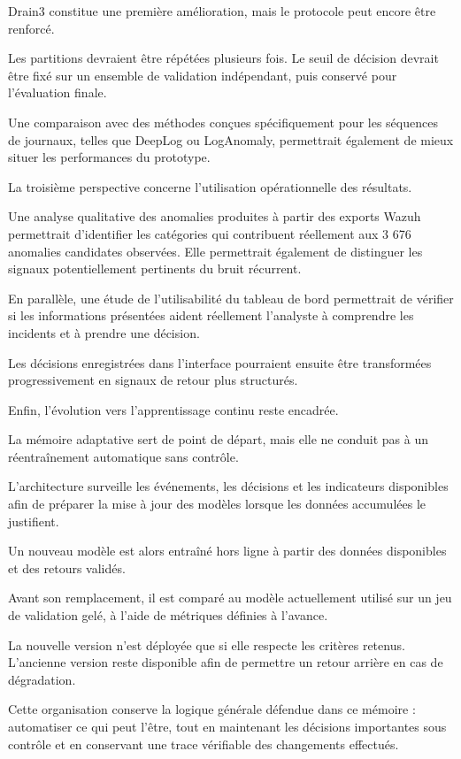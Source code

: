 Drain3 constitue une première amélioration, mais le protocole peut encore être renforcé.

Les partitions devraient être répétées plusieurs fois. Le seuil de décision devrait être fixé sur un ensemble de validation indépendant, puis conservé pour l'évaluation finale.

Une comparaison avec des méthodes conçues spécifiquement pour les séquences de journaux, telles que DeepLog ou LogAnomaly, permettrait également de mieux situer les performances du prototype.

La troisième perspective concerne l'utilisation opérationnelle des résultats.

Une analyse qualitative des anomalies produites à partir des exports Wazuh permettrait d'identifier les catégories qui contribuent réellement aux 3 676 anomalies candidates observées. Elle permettrait également de distinguer les signaux potentiellement pertinents du bruit récurrent.

En parallèle, une étude de l'utilisabilité du tableau de bord permettrait de vérifier si les informations présentées aident réellement l'analyste à comprendre les incidents et à prendre une décision.

Les décisions enregistrées dans l'interface pourraient ensuite être transformées progressivement en signaux de retour plus structurés.

Enfin, l'évolution vers l'apprentissage continu reste encadrée.

La mémoire adaptative sert de point de départ, mais elle ne conduit pas à un réentraînement automatique sans contrôle.

L'architecture surveille les événements, les décisions et les indicateurs disponibles afin de préparer la mise à jour des modèles lorsque les données accumulées le justifient.

Un nouveau modèle est alors entraîné hors ligne à partir des données disponibles et des retours validés.

Avant son remplacement, il est comparé au modèle actuellement utilisé sur un jeu de validation gelé, à l'aide de métriques définies à l'avance.

La nouvelle version n'est déployée que si elle respecte les critères retenus. L'ancienne version reste disponible afin de permettre un retour arrière en cas de dégradation.

Cette organisation conserve la logique générale défendue dans ce mémoire : automatiser ce qui peut l'être, tout en maintenant les décisions importantes sous contrôle et en conservant une trace vérifiable des changements effectués.
